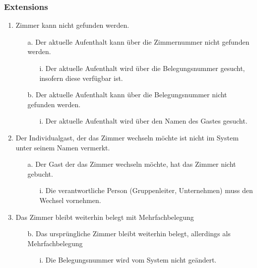 \documentclass[./detailed_overview_usecases.tex]{subfiles}
\begin{document}
    \subsubsection*{Extensions}
    \begin{enumerate}
        \item Zimmer kann nicht gefunden werden.
            \begin{itemize}
                \item[a.] Der aktuelle Aufenthalt kann über die Zimmernummer nicht gefunden werden.
                    \begin{itemize}
                         \item[i.] Der aktuelle Aufenthalt wird über die Belegungsnummer gesucht, insofern diese verfügbar ist.
                    \end{itemize}
                \item[b.] Der aktuelle Aufenthalt kann über die Belegungsnummer nicht gefunden werden.
                       \begin{itemize}
                           \item[i.] Der aktuelle Aufenthalt wird über den Namen des Gastes gesucht.
                        \end{itemize}
            \end{itemize}
        \setcounter{enumi}{2}
        \item Der Individualgast, der das Zimmer wechseln möchte ist nicht im System unter seinem Namen vermerkt.
        \begin{itemize}
            \item[a.] Der Gast der das Zimmer wechseln möchte, hat das Zimmer nicht gebucht.
                \begin{itemize}
                    \item[i.] Die verantwortliche Person (Gruppenleiter, Unternehmen) muss den Wechsel vornehmen.
                \end{itemize}
        \end{itemize}
        \item Das Zimmer bleibt weiterhin belegt mit Mehrfachbelegung
        \begin{itemize}
            \item[b.] Das ursprüngliche Zimmer bleibt weiterhin belegt, allerdings als Mehrfachbelegung
                \begin{itemize}
                        \item[i.] Die Belegungsnummer wird vom System nicht geändert.

\end{itemize}
\end{itemize}
\end{enumerate}
\end{document}

